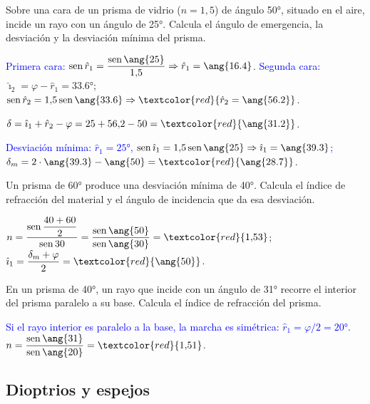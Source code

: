 \begin{exercise}
    Sobre una cara de un prisma de vidrio (\(n = 1{,}5\)) de ángulo \ang{50}, situado en el aire, incide un rayo con un
    ángulo de \ang{25}. Calcula el ángulo de emergencia, la desviación y la desviación mínima del prisma.
    \begin{solu}
        \textcolor{blue}{Primera cara:} \(\sen\hat r_1 = \dfrac{\sen\ang{25}}{1{,}5} \Rightarrow \hat r_1 = \ang{16.4}\).
        \textcolor{blue}{Segunda cara:} \(\hat{\imath}_2 = \varphi - \hat r_1 = \ang{33.6}\);
        \(\sen\hat r_2 = 1{,}5\sen\ang{33.6} \Rightarrow \textcolor{red}{\hat r_2 = \ang{56.2}}\).

        \(\delta = \hat{\imath}_1 + \hat r_2 - \varphi = 25 + 56{,}2 - 50 = \textcolor{red}{\ang{31.2}}\).

        \textcolor{blue}{Desviación mínima: \(\hat r_1 = \ang{25}\), \(\sen\hat{\imath}_1 = 1{,}5\sen\ang{25} \Rightarrow \hat{\imath}_1 = \ang{39.3}\);}
        \(\delta_m = 2\cdot\ang{39.3} - \ang{50} = \textcolor{red}{\ang{28.7}}\).
    \end{solu}
\end{exercise}

\begin{exercise}
    Un prisma de \ang{60} produce una desviación mínima de \ang{40}. Calcula el índice de refracción del material y el
    ángulo de incidencia que da esa desviación.
    \begin{solu}
        \(n = \dfrac{\sen\dfrac{40 + 60}{2}}{\sen 30} = \dfrac{\sen\ang{50}}{\sen\ang{30}} = \textcolor{red}{1{,}53}\);
        \(\hat{\imath}_1 = \dfrac{\delta_m + \varphi}{2} = \textcolor{red}{\ang{50}}\).
    \end{solu}
\end{exercise}

\begin{exercise}
    En un prisma de \ang{40}, un rayo que incide con un ángulo de \ang{31} recorre el interior del prisma paralelo a su base.
    Calcula el índice de refracción del prisma.
    \begin{solu}
        \textcolor{blue}{Si el rayo interior es paralelo a la base, la marcha es simétrica: \(\hat r_1 = \varphi/2 = \ang{20}\).}
        \(n = \dfrac{\sen\ang{31}}{\sen\ang{20}} = \textcolor{red}{1{,}51}\).
    \end{solu}
\end{exercise}

\subsection{Dioptrios y espejos}

